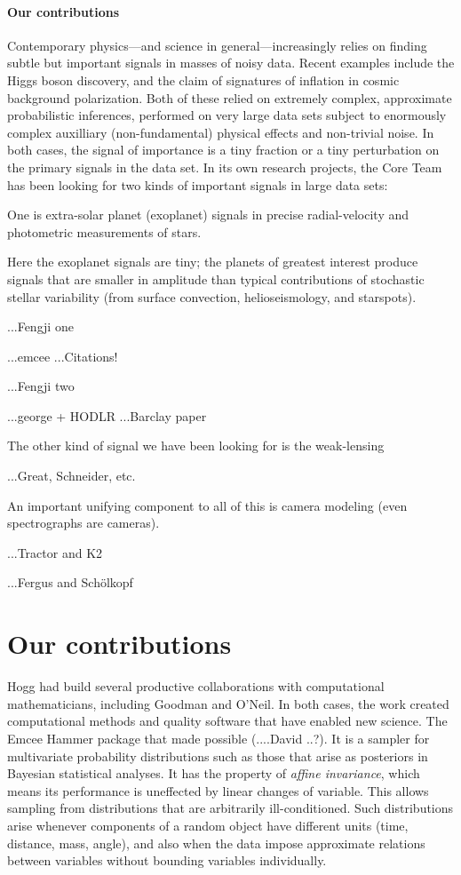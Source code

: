 \documentclass[12pt]{article}
\begin{document}
\paragraph{Our contributions}

Contemporary physics---and science in general---increasingly relies on
finding subtle but important signals in masses of noisy data.
Recent examples include the Higgs boson discovery, and the claim of
signatures of inflation in cosmic background polarization.
Both of these relied on extremely complex, approximate probabilistic
inferences, performed on very large data sets subject to enormously
complex auxilliary (non-fundamental) physical effects and non-trivial
noise.
In both cases, the signal of importance is a tiny fraction or a tiny
perturbation on the primary signals in the data set.
In its own research projects, the Core Team has been looking for two
kinds of important signals in large data sets:

One is extra-solar planet (exoplanet) signals in precise
radial-velocity and photometric measurements of stars.

Here the exoplanet signals are tiny; the planets of greatest interest
produce signals that are smaller in amplitude than typical
contributions of stochastic stellar variability (from surface
convection, helioseismology, and starspots).

...Fengji one

...emcee ...Citations!

...Fengji two

...george + HODLR ...Barclay paper

The other kind of signal we have been looking for is the weak-lensing

...Great, Schneider, etc.

An important unifying component to all of this is camera modeling
(even spectrographs are cameras).

...Tractor and K2

...Fergus and Sch\"olkopf



\section*{Our contributions}
Hogg had build several productive collaborations with computational mathematicians, including
Goodman and O'Neil.
In both cases, the work created computational methods and quality software that have enabled
new science.
The Emcee Hammer package that made possible (....David ..?). 
It is a sampler for multivariate probability distributions such as those that arise
as posteriors in Bayesian statistical analyses.
It has the property of {\em affine invariance}, which means its performance is uneffected  
by linear changes of variable.
This allows sampling from distributions that are arbitrarily ill-conditioned.
Such distributions arise whenever components of a random object have different
units (time, distance, mass, angle), and also when the data impose approximate relations 
between variables without bounding variables individually.
\end{document}
